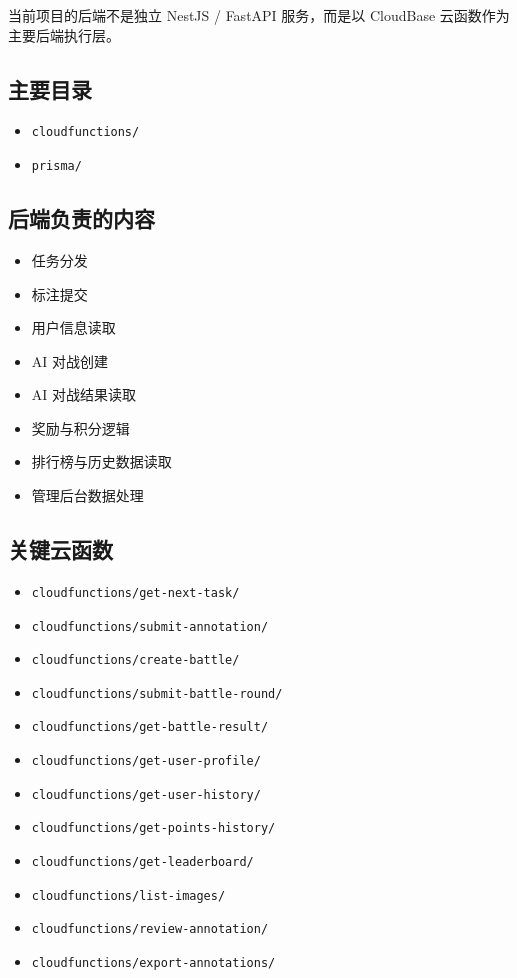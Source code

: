 \documentclass[11pt,a4paper]{ctexart}
\begin{document}
当前项目的后端不是独立 NestJS / FastAPI 服务，而是以 CloudBase 云函数作为主要后端执行层。

\subsection{主要目录}

\begin{itemize}
  \item \texttt{cloudfunctions/}
  \item \texttt{prisma/}
\end{itemize}

\subsection{后端负责的内容}

\begin{itemize}
  \item 任务分发
  \item 标注提交
  \item 用户信息读取
  \item AI 对战创建
  \item AI 对战结果读取
  \item 奖励与积分逻辑
  \item 排行榜与历史数据读取
  \item 管理后台数据处理
\end{itemize}

\subsection{关键云函数}

\begin{itemize}
  \item \texttt{cloudfunctions/get-next-task/}
  \item \texttt{cloudfunctions/submit-annotation/}
  \item \texttt{cloudfunctions/create-battle/}
  \item \texttt{cloudfunctions/submit-battle-round/}
  \item \texttt{cloudfunctions/get-battle-result/}
  \item \texttt{cloudfunctions/get-user-profile/}
  \item \texttt{cloudfunctions/get-user-history/}
  \item \texttt{cloudfunctions/get-points-history/}
  \item \texttt{cloudfunctions/get-leaderboard/}
  \item \texttt{cloudfunctions/list-images/}
  \item \texttt{cloudfunctions/review-annotation/}
  \item \texttt{cloudfunctions/export-annotations/}
\end{itemize}
\end{document}
